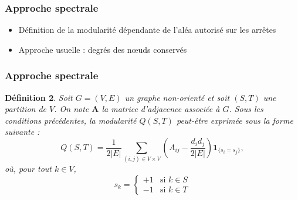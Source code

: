 \documentclass[c]{beamer}
\newtheorem*{deffr}{Définition}
\begin{document}
\begin{frame}
    \frametitle{Approche spectrale}
    \begin{itemize}
        \begin{deffr}
            Soit $G = (V, E)$ un graphe non-orienté et soit $(S, T)$ une
            partition de $V$. La modularité associée à la partition $(S, T)$
            correspond taux d'arrêtes de $E$ contenues dans $S$ ou $T$ comparé
            au taux d'arrêtes qui auraient été contenues dans $S$ ou $T$ si
            l'on avait distribué les arrêtes du graphe aléatoirement.
        \end{deffr}

        \item Définition de la modularité dépendante de l'aléa autorisé sur
        les arrêtes
        \item Approche usuelle : degrés des n\oe{}uds conservés
    \end{itemize}

\end{frame}

\begin{frame}
    \frametitle{Approche spectrale}
    \begin{deffr}
        Soit $G = (V, E)$ un graphe non-orienté et soit $(S, T)$ une partition
        de $V$. On note $\mathbf{A}$ la matrice d'adjacence associée à $G$.
        Sous les conditions précédentes, la modularité $Q(S, T)$ peut-être
        exprimée sous la forme suivante :
        \[
            Q(S, T) = \frac{1}{2|E|} \sum_{(i, j) \in V \times V}
                \left( A_{ij} - \frac{d_i d_j}{2|E|} \right)
                \mathbf{1}_{\{s_i = s_j\}},
        \]
        où, pour tout $k \in V$,
        \[
            s_k = \left\{
                \begin{array}{ll}
                    +1 & \text{si $k \in S$} \\
                    -1 & \text{si $k \in T$}
                \end{array}
            \right.
        \]
    \end{deffr}

\end{frame}
\end{document}
